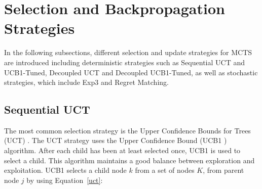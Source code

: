 \documentclass{article}
\begin{document}


\section{Selection and Backpropagation Strategies}
\label{sec:selection_strategies}

In the following subsections, different selection and update strategies for MCTS are introduced including deterministic strategies such as Sequential UCT and UCB1-Tuned, Decoupled UCT and Decoupled UCB1-Tuned, as well as stochastic strategies, which include Exp3 and Regret Matching. 

\subsection{Sequential UCT}
\label{subsec:uct}
The most common selection strategy is the Upper Confidence Bounds for Trees (UCT) \cite{kocsis}. The UCT strategy uses the Upper Confidence Bound (UCB1 \cite{auer_et_al}) algorithm. 
After each child has been at least selected once, UCB1 is used to select a child. This algorithm maintains a good balance between exploration and exploitation. UCB1 selects a child node $k$ from a set of nodes $K$, from parent node $j$ by using Equation~\ref{uct}:
\end{document}
